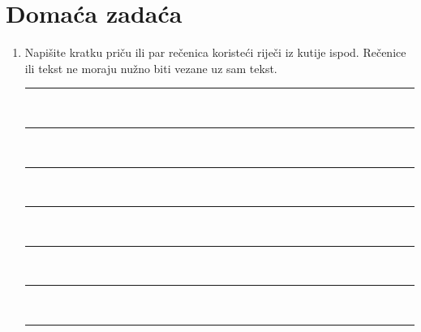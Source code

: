 \documentclass[a5paper, 10pt]{tekst}
\begin{document}
	\section*{Domaća zadaća}
	\begin{enumerate}
		\item Napišite kratku priču ili par rečenica koristeći riječi iz kutije ispod.
		Rečenice ili tekst ne moraju nužno biti vezane uz sam tekst.
		\begin{center}
			\vspace{0.5em}
			\vspace{1.4em}
			\rule{\linewidth}{0.5pt}\\[0.6em]
			\rule{\linewidth}{0.5pt}\\[0.6em]
			\rule{\linewidth}{0.5pt}\\[0.6em]
			\rule{\linewidth}{0.5pt}\\[0.6em]
			\rule{\linewidth}{0.5pt}\\[0.6em]
			\rule{\linewidth}{0.5pt}\\[0.6em]
			\rule{\linewidth}{0.5pt}
		\end{center}
		

\end{enumerate}
\end{document}

